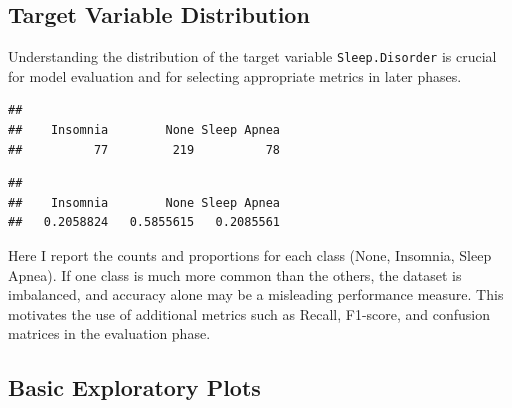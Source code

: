 \documentclass[
]{article}
\newenvironment{Shaded}{\begin{snugshade}}{\end{snugshade}}
\newcommand{\FunctionTok}[1]{\textcolor[rgb]{0.13,0.29,0.53}{\textbf{#1}}}
\newcommand{\NormalTok}[1]{#1}
\newcommand{\SpecialCharTok}[1]{\textcolor[rgb]{0.81,0.36,0.00}{\textbf{#1}}}
\begin{document}
\subsection{Target Variable
Distribution}\label{target-variable-distribution}

Understanding the distribution of the target variable
\texttt{Sleep.Disorder} is crucial for model evaluation and for
selecting appropriate metrics in later phases.

\begin{Shaded}
\end{Shaded}

\begin{verbatim}
## 
##    Insomnia        None Sleep Apnea 
##          77         219          78
\end{verbatim}

\begin{Shaded}
\end{Shaded}

\begin{verbatim}
## 
##    Insomnia        None Sleep Apnea 
##   0.2058824   0.5855615   0.2085561
\end{verbatim}

Here I report the counts and proportions for each class (None, Insomnia,
Sleep Apnea). If one class is much more common than the others, the
dataset is imbalanced, and accuracy alone may be a misleading
performance measure. This motivates the use of additional metrics such
as Recall, F1-score, and confusion matrices in the evaluation phase.

\subsection{Basic Exploratory Plots}\label{basic-exploratory-plots}
\end{document}
